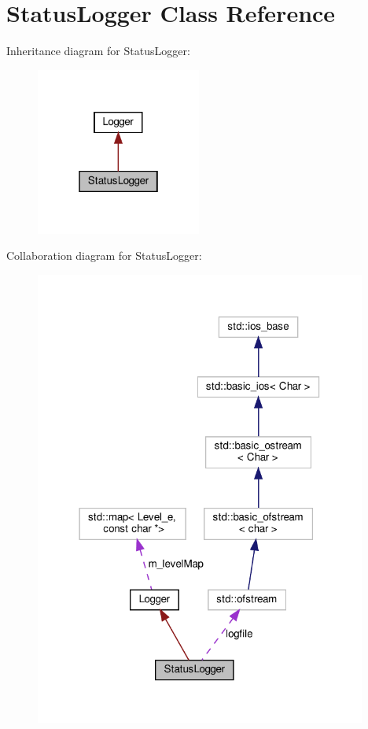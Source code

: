 \hypertarget{classStatusLogger}{}\section{Status\+Logger Class Reference}
\label{classStatusLogger}


Inheritance diagram for Status\+Logger\+:\nopagebreak
\begin{figure}[H]
\begin{center}
\leavevmode
\includegraphics[width=154pt]{classStatusLogger__inherit__graph}
\end{center}
\end{figure}


Collaboration diagram for Status\+Logger\+:\nopagebreak
\begin{figure}[H]
\begin{center}
\leavevmode
\includegraphics[width=309pt]{classStatusLogger__coll__graph}
\end{center}
\end{figure}
